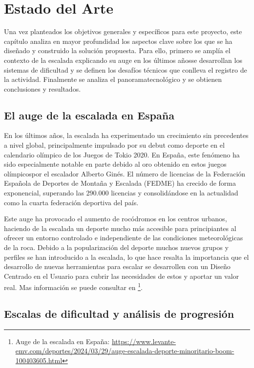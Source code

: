\chapter{Estado del Arte}
\label{cap:estadoDelArte}

Una vez planteados los objetivos generales y específicos para este proyecto, este capítulo analiza en mayor profundidad los aspectos clave sobre los que se ha diseñado y construido la solución propuesta. Para ello, primero se amplía el contexto de la escalada explicando su auge en los últimos añosse desarrollan los sistemas de dificultad y se definen los desafíos técnicos que conlleva el registro de la actividad. Finalmente se analiza el panoramatecnológico y se obtienen conclusiones y resultados.

\section{El auge de la escalada en España}

En los últimos años, la escalada ha experimentado un crecimiento sin precedentes a nivel global, principalmente impulsado por su debut como deporte en el calendario olímpico de los Juegos de Tokio 2020. En España, este fenómeno ha sido especialmente notable en parte debido al oro obtenido en estos juegos olímpicospor el escalador Alberto Ginés. El número de licencias de la Federación Española de Deportes de Montaña y Escalada (FEDME) ha crecido de forma exponencial, superando las 290.000 licencias y consolidándose en la actualidad como la cuarta federación deportiva del país. 

Este auge ha provocado el aumento de rocódromos en los centros urbanos, haciendo de la escalada un deporte mucho más accesible para principiantes al ofrecer un entorno controlado e independiente de las condiciones meteorológicas de la roca. Debido a la popularización del deporte muchos nuevos grupos y perfiles se han introducido a la escalada, lo que hace resalta la importancia que el desarrollo de nuevas herramientas para escalar se desarrollen con un Diseño Centrado en el Usuario para cubrir las necesidades de estos y aportar un valor real. Mas información se puede consultar en 
\footnote{Auge de la escalada en España: \url{https://www.levante-emv.com/deportes/2024/03/29/auge-escalada-deporte-minoritario-boom-100403605.html}}. 

\section{Escalas de dificultad y análisis de progresión}

